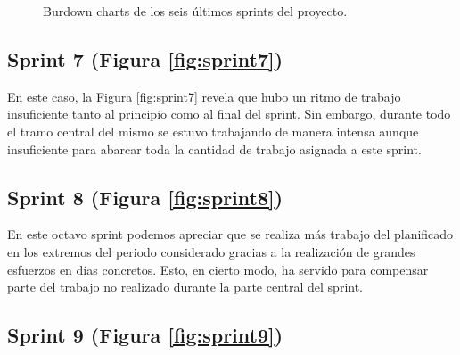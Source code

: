 \begin{figure}[H]
\centering
{}\qquad
{}\qquad
{}\qquad
{}\qquad
{}\qquad
{}
\caption{Burdown charts de los seis últimos sprints del proyecto.}
\label{fig:sprints7-12}
\end{figure}

\subsection{Sprint 7 (Figura \ref{fig:sprint7})}

En este caso, la Figura \ref{fig:sprint7} revela que hubo un ritmo de trabajo insuficiente tanto al principio como al final del sprint. Sin embargo, durante todo el tramo central del mismo se estuvo trabajando de manera intensa aunque insuficiente para abarcar toda la cantidad de trabajo asignada a este sprint.

\subsection{Sprint 8 (Figura \ref{fig:sprint8})}

En este octavo sprint podemos apreciar que se realiza más trabajo del planificado en los extremos del periodo considerado gracias a la realización de grandes esfuerzos en días concretos. Esto, en cierto modo, ha servido para compensar parte del trabajo no realizado durante la parte central del sprint.

\subsection{Sprint 9 (Figura \ref{fig:sprint9})}

